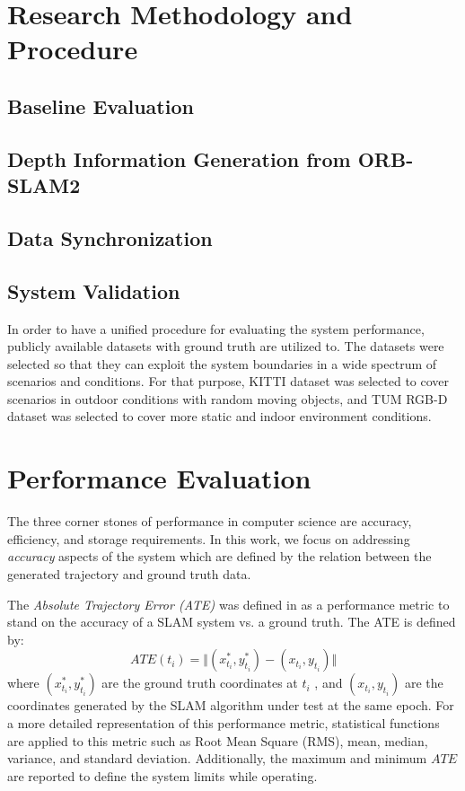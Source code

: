 \documentclass[12pt]{article}
\begin{document}
\section{Research Methodology and Procedure}
\subsection{Baseline Evaluation}
\subsection{Depth Information Generation from ORB-SLAM2}
\subsection{Data Synchronization}
\subsection{System Validation}
In order to have a unified procedure for evaluating the system performance, publicly available datasets with ground truth are utilized to. The datasets were selected so that they can exploit the system boundaries in a wide spectrum of scenarios and conditions. For that purpose, KITTI dataset \cite{Geiger2012CVPR} was selected to cover scenarios in outdoor conditions with random moving objects, and TUM RGB-D dataset \cite{sturm2012benchmark} was selected to cover more static and indoor environment conditions.

\section{Performance Evaluation}
The three corner stones of performance in computer science are accuracy, efficiency, and storage requirements. In this work, we focus on addressing \textit{accuracy} aspects of the system which are defined by the relation between the generated trajectory and ground truth data. 

The \textit{Absolute Trajectory Error (ATE)} was defined in \cite{8710464} as a performance metric to stand on the accuracy of a SLAM system vs. a ground truth. The ATE is defined by:
\begin{equation}
ATE(t_i) = \Vert (x_{t_i}^*,y_{t_i}^*) - (x_{t_i},y_{t_i}) \Vert
\end{equation}
where $(x_{t_i}^*,y_{t_i}^*)$ are the ground truth coordinates at $t_i$ , and $(x_{t_i},y_{t_i})$ are the coordinates generated by the SLAM algorithm under test at the same epoch. For a more detailed representation of this performance metric, statistical functions are applied to this metric such as Root Mean Square (RMS), mean, median, variance, and standard deviation. Additionally, the maximum and minimum $ATE$ are reported to define the system limits while operating. 
\end{document}
